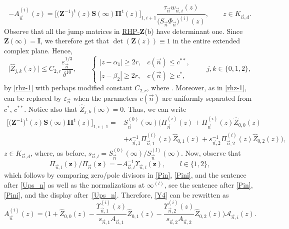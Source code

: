 \documentclass[pdftex]{sigma}
\numberwithin{equation}{section}
\renewcommand{\det}{\operatorname{det}}
\newcommand{\n}{{\vec n}}
\newcommand{\rhz} {\textnormal{RHP}-${\boldsymbol Z}$}
\newcommand{\z}	{{\boldsymbol z}}
\begin{document}
\begin{equation}
\label{Y4}
-A_\n^{(i)}(z) = \big[\bigl(\boldsymbol Z^{-1}\bigr)^{\mathrm t}(z) \boldsymbol S(\infty) \boldsymbol \Pi^\mathrm{t}(z)\big]_{1,i+1} \frac{\tau_\n w_{\n,i}(z)}{\bigl(S_\n\Phi_\n\bigr)^{(i)}(z)}, \qquad z\in K_{\n,d}.
\end{equation}
Observe that all the jump matrices in \hyperref[rhz]{\rhz}(b) have determinant one. Since $ \boldsymbol Z(\infty)=\boldsymbol I $, we therefore get that $ \det(\boldsymbol Z(z))\equiv 1 $ in the entire extended complex plane. Hence,
\begin{equation}
\label{defhatB}
\big| \widehat Z_{j,k}(z)\big| \leq C_{2,r}\frac{\varepsilon_\n^{1/3}}{\delta^{10}}, \qquad
\begin{cases}
|z-\alpha_1|\geq 2r, & c(\n)\leq c^{\ast\ast}, \\
|z-\beta_2| \geq 2r, & c(\n)\geq c^\ast,
\end{cases} \qquad j,k\in\{0,1,2\},
\end{equation}
by \eqref{rhz-1} with perhaps modified constant $ C_{2,r} $, where . Moreover, as in \eqref{rhz-1}, \smash{$ \varepsilon_\n^{1/3} $} can be replaced by $ \varepsilon_\n $ when the parameters $ c(\n) $ are uniformly separated from $ c^*$, $c^{**} $. Notice also that $ \widehat Z_{j,k}(\infty) =0 $. Thus, we can write
\begin{align*}
\big[\bigl(\boldsymbol Z^{-1}\bigr)^{\mathrm t}(z)\boldsymbol S(\infty)\boldsymbol \Pi^\mathrm{t}(z)\big]_{1,i+1} ={}&
S_\n^{(0)}(\infty)\bigl(\Pi_\n^{(i)}(z) + \Pi_\n^{(i)}(z)\widehat Z_{0,0}(z) \\
& + s_{\n,1}^{-1}\Pi_{\n,1}^{(i)}(z)\widehat Z_{0,1}(z) + s_{\n,2}^{-1}\Pi_{\n,2}^{(i)}(z)\widehat Z_{0,2}(z) \bigr),
\end{align*}
$ z\in K_{\n,d} $, where, as before, $ s_{\n,l} = S_\n^{(0)}(\infty)/S_\n^{(l)}(\infty) $. Now, observe that
\[
\Pi_{\n,l}(\z) / \Pi_\n(\z) = -A_{\n,l}^{-1}\Upsilon_{\n,l}(\z), \qquad l\in\{1,2\},
\]
which follows by comparing zero/pole divisors in \eqref{Pin}, \eqref{Pini}, and the sentence after \eqref{Ups_n} as well as the normalizations at $ \infty^{(l)} $, see the sentence after \eqref{Pin}, \eqref{Pini}, and the display after~\eqref{Ups_n}. Therefore, \eqref{Y4} can be rewritten as
\begin{equation}
\label{Y5}
A_\n^{(i)}(z) = \Bigg(1 + \widehat Z_{0,0}(z) - \frac{\Upsilon_{\n,1}^{(i)}(z)}{s_{\n,1}A_{\n,1}} \widehat Z_{0,1}(z) - \frac{\Upsilon_{\n,2}^{(i)}(z)}{s_{\n,2}A_{\n,2}} \widehat Z_{0,2}(z) \Bigg) \mathcal A_{\n,i}(z).
\end{equation}
\end{document}
